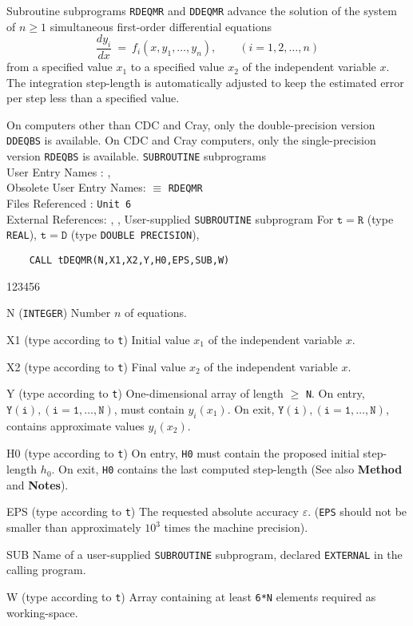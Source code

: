                           
                 
\Submitter{}                             
                 
Subroutine subprograms {\tt RDEQMR}  and {\tt DDEQMR} advance the
solution of the system of $n \ge 1$ simultaneous first-order
differential equations
$$ \frac{dy_i}{dx} \ = \
f_i(x,y_1,\ldots,y_n), \qquad (i = 1,2,\ldots,n)$$
from a specified value $x_1$ to a specified value $x_2$ of the
independent variable $x$. The integration step-length is automatically
adjusted to keep the estimated error per step less than a specified
value.
\par
On computers other than CDC and Cray, only the double-precision version
{\tt DDEQBS} is available. On CDC and Cray computers,
only the single-precision version {\tt RDEQBS} is available.
\Structure
{\tt SUBROUTINE} subprograms \\
User Entry Names : , \\
Obsolete User Entry Names:  $\equiv$ {\tt RDEQMR} \\
Files  Referenced : {\tt Unit 6} \\
External References: , ,
User-supplied {\tt SUBROUTINE} subprogram
\Usage
For $\mathtt{t=R}$ (type {\tt REAL}), $\mathtt{t=D}$ (type
{\tt DOUBLE PRECISION}),
\begin{verbatim}
    CALL tDEQMR(N,X1,X2,Y,H0,EPS,SUB,W)
\end{verbatim}
\begin{DLtt}{123456}
\item[N] ({\tt INTEGER}) Number $n$ of equations.
\item[X1] (type according to {\tt t}) Initial value $x_1$ of the
independent variable $x$.
\item[X2] (type according to {\tt t})
Final value $x_2$ of the independent variable $x$.
\item[Y] (type according to {\tt t})
One-dimensional array of length $\ge $ {\tt N}.
On entry, $\mathtt{Y(i),(i=1,\ldots,N)}$, must contain $y_i(x_1)$.
On exit, $\mathtt{Y(i),(i=1,\ldots,N)}$, contains approximate values
 $y_i(x_2)$.
\item[H0] (type according to {\tt t}) On entry, {\tt H0} must contain the
proposed initial step-length $h_0$. On exit, {\tt H0} contains the
last computed step-length (See also {\bf Method} and {\bf Notes}).
\item[EPS] (type according to {\tt t}) The requested absolute
accuracy $\varepsilon$. ({\tt EPS} should not be smaller than
approximately $10^3$ times the machine precision).
\item[SUB] Name of a user-supplied {\tt SUBROUTINE} subprogram,
declared {\tt EXTERNAL} in the calling program.
\item[W] (type according to {\tt t}) Array containing at least
{\tt 6*N} elements required as working-space.
\end{DLtt}
